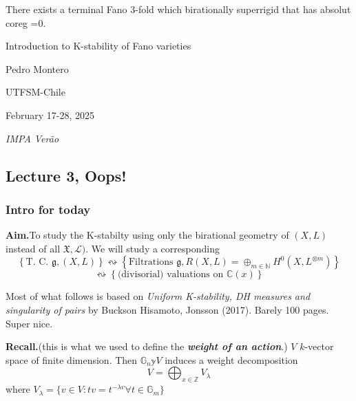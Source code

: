 \begin{thm}[Kaloghiro, 10]\leavevmode
	There exists a terminal Fano 3-fold which birationally superrigid that has absolut coreg =0.
\end{thm}


\clearpage{}
{\Huge Introduction to K-stability of Fano varieties}

\hfill{\Large Pedro Montero}

{\Large \hfill UTFSM-Chile}

\hfill{\large February 17-28, 2025

\hfill \textit{IMPA Verão}}

\subsection{Lecture 3, Oops!}

\subsubsection{Intro for today}

{\color{4}\bfseries Aim.}\hspace{.5em}To study the K-stabilty using only the birational geometry of \((X,L)\) instead of all \(\mathfrak{X},\mathcal{L})\). We will study a corresponding
\[\left\{ \text{T. C. } \mathfrak{g}, (X,L) \right\} \leftrightsquigarrow \left\{ \text{Filtrations } \mathfrak{g}, R(X,L)=\oplus_{m \in \mathbb{N}}H^{0}(X,L^{\otimes m}) \right\} \]
\[\leftrightsquigarrow \left\{ \text{(divisorial) valuations on \(\mathbb{C}(x)\)}  \right\} \]
\begin{remark}\leavevmode
Most of what follows is based on \textit{Uniform K-stability, DH measures and singularity of pairs} by Buckson Hisamoto, Jonsson (2017). Barely 100 pages. Super nice.
\end{remark}

{\color{6}\bfseries Recall.}\hspace{.5em}(this is what we used to define the \textit{\textbf{weight of an action}}.) \(V\) \(k\)-vector space of finite dimension. Then \(\mathbb{G}_n \mathbb{y} V\) induces a weight decomposition
\[V = \bigoplus_{x \in \mathbb{Z}}V_\lambda\]
where \(V_\lambda=\{v \in V:tv = t^{-\lambda v}\forall  t \in \mathbb{G}_m\}\)

